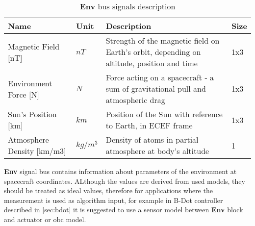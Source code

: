         
        \begin{table}[H]
            \begin{tabularx}{\textwidth}{llXl}
            \textbf{Name} & \textbf{Unit} & \textbf{Description} & \textbf{Size} \\ \hline
            Magnetic Field [nT] & $nT$ & Strength of the magnetic field on Earth's orbit, depending on altitude, position and time & 1x3 \\
            Environment Force [N]& $N$ & Force acting on a spacecraft - a sum of gravitational pull and atmospheric drag & 1x3 \\
            Sun's Position [km] & $km$ & Position of the Sun with reference to Earth, in ECEF frame & 1x3 \\
            Atmosphere Density [km/m3]& $kg/m^3$ & Density of atoms in partial atmosphere at body's altitude & 1 \\ \hline
            \end{tabularx}
            \caption{\textbf{Env} bus signals description}
        \end{table}

        \textbf{Env} signal bus contains information about parameters of the environment at spacecraft coordinates. ALthough the values are derived from used models, they should be treated as ideal values, therefore for applications where the measurement is used as algorithm input, for example in B-Dot controller described in \autoref{sec:bdot} it is suggested to use a sensor model between \textbf{Env} block and actuator or \ac{obc} model.  